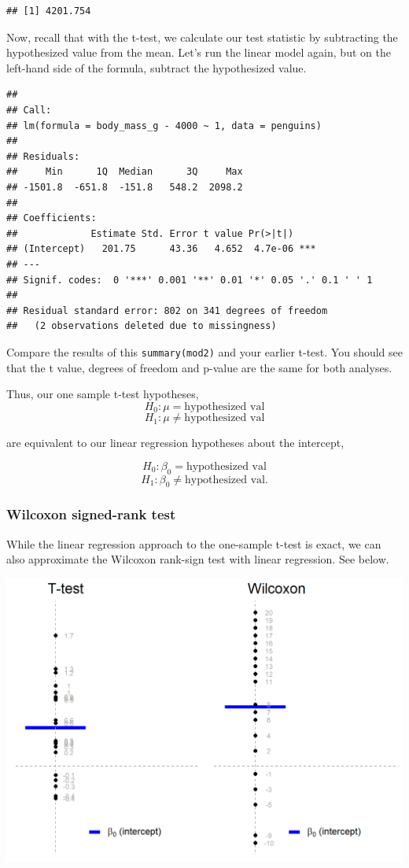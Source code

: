 \documentclass[
]{book}
\begin{document}
\begin{verbatim}
## [1] 4201.754
\end{verbatim}

Now, recall that with the t-test, we calculate our test statistic by subtracting the hypothesized value from the mean. Let's run the linear model again, but on the left-hand side of the formula, subtract the hypothesized value.

\begin{verbatim}
## 
## Call:
## lm(formula = body_mass_g - 4000 ~ 1, data = penguins)
## 
## Residuals:
##     Min      1Q  Median      3Q     Max 
## -1501.8  -651.8  -151.8   548.2  2098.2 
## 
## Coefficients:
##             Estimate Std. Error t value Pr(>|t|)    
## (Intercept)   201.75      43.36   4.652  4.7e-06 ***
## ---
## Signif. codes:  0 '***' 0.001 '**' 0.01 '*' 0.05 '.' 0.1 ' ' 1
## 
## Residual standard error: 802 on 341 degrees of freedom
##   (2 observations deleted due to missingness)
\end{verbatim}

Compare the results of this \texttt{summary(mod2)} and your earlier t-test. You should see that the t value, degrees of freedom and p-value are the same for both analyses.

Thus, our one sample t-test hypotheses,
\[H_0: \mu = \text{hypothesized val}\]
\[H_1: \mu \ne \text{hypothesized val}\]

are equivalent to our linear regression hypotheses about the intercept,

\[H_0: \beta_0 = \text{hypothesized val}\]
\[H_1: \beta_0 \ne \text{hypothesized val}.\]

\hypertarget{wilcoxon-signed-rank-test}{%
\subsubsection{Wilcoxon signed-rank test}\label{wilcoxon-signed-rank-test}}

While the linear regression approach to the one-sample t-test is exact, we can also approximate the Wilcoxon rank-sign test with linear regression. See below.

\begin{center}\includegraphics[width=0.9\linewidth]{images/m1/wilcoxon} \end{center}
\end{document}
